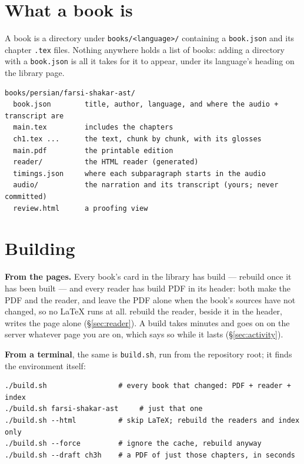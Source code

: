 \documentclass[11pt,oneside]{report}
\newcommand{\file}[1]{\texttt{#1}}
\newcommand{\menu}[1]{\textsf{#1}}
\begin{document}
\section{What a book is}

A book is a directory under \file{books/<language>/} containing a
\file{book.json} and its chapter \file{.tex} files. Nothing anywhere holds a
list of books: adding a directory with a \file{book.json} is all it takes for
it to appear, under its language's heading on the library page.

\begin{lstlisting}
books/persian/farsi-shakar-ast/
  book.json        title, author, language, and where the audio + transcript are
  main.tex         includes the chapters
  ch1.tex ...      the text, chunk by chunk, with its glosses
  main.pdf         the printable edition
  reader/          the HTML reader (generated)
  timings.json     where each subparagraph starts in the audio
  audio/           the narration and its transcript (yours; never committed)
  review.html      a proofing view
\end{lstlisting}

\section{Building}

\textbf{From the pages.} Every book's card in the library has
\menu{build} --- \menu{rebuild} once it has been built --- and every reader
has \menu{build PDF} in its header: both make the PDF and the reader, and
leave the PDF alone when the book's sources have not changed, so no LaTeX
runs at all. \menu{rebuild the reader}, beside it in the header, writes the
page alone (\S\ref{sec:reader}). A build takes minutes and goes on on the
server whatever page you are on, which says so while it lasts
(\S\ref{sec:activity}).

\textbf{From a terminal}, the same is \file{build.sh}, run from the
repository root; it finds the environment itself:

\begin{lstlisting}
./build.sh                 # every book that changed: PDF + reader + index
./build.sh farsi-shakar-ast     # just that one
./build.sh --html          # skip LaTeX; rebuild the readers and index only
./build.sh --force         # ignore the cache, rebuild anyway
./build.sh --draft ch3h    # a PDF of just those chapters, in seconds
\end{lstlisting}
\end{document}

